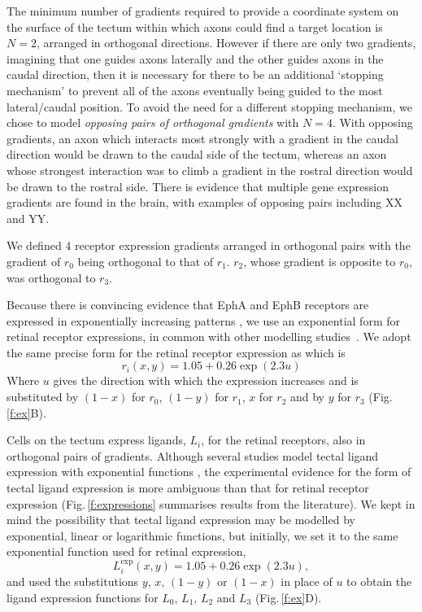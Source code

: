 \documentclass[11pt, a4paper, draft]{article}
\begin{document}
The minimum number of gradients required to provide a coordinate system on the
surface of the tectum within which axons could find a target location is
$N=2$, arranged in orthogonal directions. However if there are only two
gradients, imagining that one guides axons laterally and the other guides
axons in the caudal direction, then it is necessary for there to be an
additional `stopping mechanism' to prevent all of the axons eventually being
guided to the most lateral/caudal position. To avoid the need for a different
stopping mechanism, we chose to model \emph{opposing pairs of orthogonal
gradients} with $N=4$. With opposing gradients, an axon which interacts most
strongly with a gradient in the caudal direction would be drawn to the caudal
side of the tectum, whereas an axon whose strongest interaction was to climb a
gradient in the rostral direction would be drawn to the rostral side. There is
evidence that multiple gene expression gradients are found in the brain, with
examples of opposing pairs including XX and YY.

We defined 4 receptor expression gradients arranged in orthogonal pairs
with the gradient of $r_0$ being orthogonal to that of $r_1$. $r_2$, whose
gradient is opposite to $r_0$, was orthogonal to $r_3$.

Because there is convincing evidence that EphA and EphB receptors are
expressed in exponentially increasing
patterns \citep{reber_relative_2004,feldheim_genetic_2000,brown_topographic_2000,koulakov_stochastic_2004},
we use an exponential form for retinal receptor expressions, in common with
other modelling
studies~\citep{reber_relative_2004,koulakov_stochastic_2004,simpson_simple_2011}.
We adopt the same precise form for the retinal receptor expression
as \citet{simpson_simple_2011} which is
\begin{equation} \label{e:retrcpt}
r_i(x,y) = 1.05 + 0.26 \exp(2.3 u)
\end{equation}
Where $u$ gives the direction with which the expression increases and is
substituted by $(1-x)$ for $r_0$, $(1-y)$ for $r_1$, $x$ for $r_2$ and by $y$ for
$r_3$ (Fig.\,\ref{f:ex}B).

Cells on the tectum express ligands, $L_i$, for the retinal receptors, also in
orthogonal pairs of gradients. Although several studies model tectal ligand
expression with exponential functions \citep{koulakov_stochastic_2004}, the
experimental evidence for the form of tectal ligand expression is more ambiguous than that for
retinal receptor expression (Fig.\,\ref{f:expressions} summarises results from
the literature). We kept in mind the
possibility that tectal ligand expression may be modelled by exponential,
linear or logarithmic functions, but initially, we set it to the same
exponential function used for retinal expression,
\begin{equation} \label{e:tecligexp}
L_i^{\text{exp}}(x,y) = 1.05 + 0.26 \exp(2.3 u),
\end{equation}
and used the substitutions $y$, $x$, $(1-y)$ or $(1-x)$ in place of $u$ to obtain
the ligand expression functions for $L_0$, $L_1$, $L_2$ and $L_3$
(Fig.\,\ref{f:ex}D).
\end{document}
